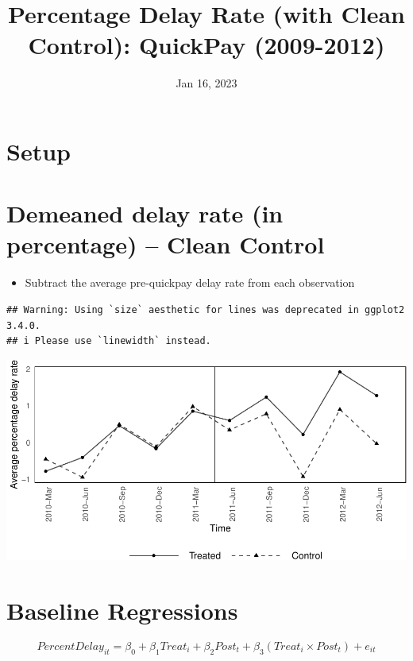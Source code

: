 \documentclass[
]{article}
\title{Percentage Delay Rate (with Clean Control): QuickPay (2009-2012)}
\author{}
\date{\vspace{-2.5em}Jan 16, 2023}
\providecommand{\tightlist}{%
  \setlength{\itemsep}{0pt}\setlength{\parskip}{0pt}}
\begin{document}
\maketitle

\hypertarget{setup}{%
\section{Setup}\label{setup}}

\hypertarget{demeaned-delay-rate-in-percentage-clean-control}{%
\section{Demeaned delay rate (in percentage) -- Clean
Control}\label{demeaned-delay-rate-in-percentage-clean-control}}

\begin{itemize}
\tightlist
\item
  Subtract the average pre-quickpay delay rate from each observation
\end{itemize}

\begin{verbatim}
## Warning: Using `size` aesthetic for lines was deprecated in ggplot2 3.4.0.
## i Please use `linewidth` instead.
\end{verbatim}

\includegraphics{qp_first_pc_delay_clean_control_files/figure-latex/demeaned_plot_one_type-1.pdf}

\hypertarget{baseline-regressions}{%
\section{Baseline Regressions}\label{baseline-regressions}}

\[ PercentDelay_{it} = \beta_0 + \beta_1 Treat_i + \beta_2 Post_t + \beta_3 (Treat_i \times Post_t) + e_{it}\]
\end{document}
